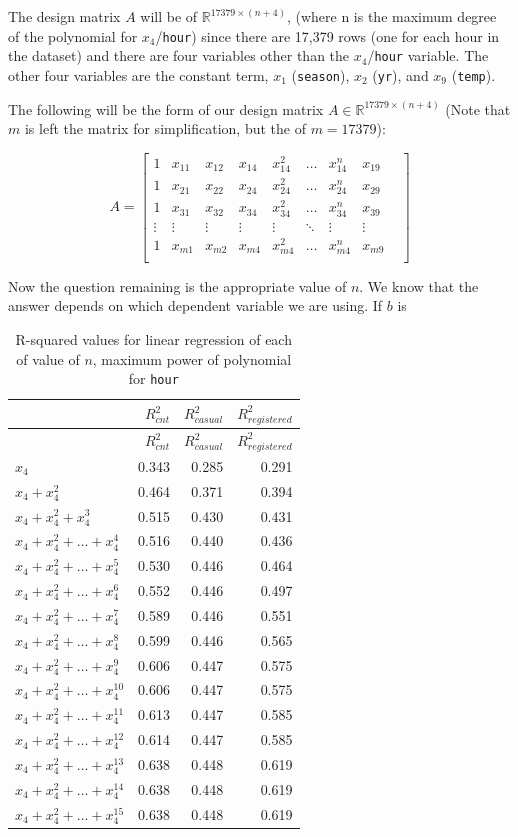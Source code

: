 \documentclass[
]{article}
\begin{document}
The design matrix \(A\) will be of \(\mathbb{R}^{17379 \times (n+4)}\),
(where n is the maximum degree of the polynomial for
\(x_{4}\)/\texttt{hour}) since there are 17,379 rows (one for each hour
in the dataset) and there are four variables other than the
\(x_{4}\)/\texttt{hour} variable. The other four variables are the
constant term, \(x_{1}\) (\texttt{season}), \(x_{2}\) (\texttt{yr}), and
\(x_{9}\) (\texttt{temp}).

The following will be the form of our design matrix
\(A \in \mathbb{R}^{17379 \times (n+4)}\) (Note that \(m\) is left the
matrix for simplification, but the of \(m = 17379\)):

\[
A=
  \begin{bmatrix}
    1 & x_{11} & x_{12} & x_{14} & x_{14}^{2} & \dots & x_{14}^{n} & x_{19} \\
    1 & x_{21} & x_{22} & x_{24} & x_{24}^{2} & \dots & x_{24}^{n} & x_{29} \\
    1 & x_{31} & x_{32} & x_{34} & x_{34}^{2} & \dots & x_{34}^{n} & x_{39} \\
    \vdots & \vdots & \vdots & \vdots & \vdots & \ddots & \vdots & \vdots & \\
    1 & x_{m1} & x_{m2} & x_{m4} & x_{m4}^{2} & \dots & x_{m4}^{n} & x_{m9} \\
  \end{bmatrix}
\]

Now the question remaining is the appropriate value of \(n\). We know
that the answer depends on which dependent variable we are using. If
\(b\) is

\begin{longtable}[]{@{}lrrr@{}}
\caption{R-squared values for linear regression of each of value of
\(n\), maximum power of polynomial for \texttt{hour}}\tabularnewline
\toprule
& \(R^{2}_{cnt}\) & \(R^{2}_{casual}\) &
\(R^{2}_{registered}\)\tabularnewline
\midrule
\endfirsthead
\toprule
& \(R^{2}_{cnt}\) & \(R^{2}_{casual}\) &
\(R^{2}_{registered}\)\tabularnewline
\midrule
\endhead
\(x_{4}\) & 0.343 & 0.285 & 0.291\tabularnewline
\(x_{4}+x_{4}^{2}\) & 0.464 & 0.371 & 0.394\tabularnewline
\(x_{4}+x_{4}^{2}+x_{4}^{3}\) & 0.515 & 0.430 & 0.431\tabularnewline
\(x_{4}+x_{4}^{2}+\dots+x_{4}^{4}\) & 0.516 & 0.440 &
0.436\tabularnewline
\(x_{4}+x_{4}^{2}+\dots+x_{4}^{5}\) & 0.530 & 0.446 &
0.464\tabularnewline
\(x_{4}+x_{4}^{2}+\dots+x_{4}^{6}\) & 0.552 & 0.446 &
0.497\tabularnewline
\(x_{4}+x_{4}^{2}+\dots+x_{4}^{7}\) & 0.589 & 0.446 &
0.551\tabularnewline
\(x_{4}+x_{4}^{2}+\dots+x_{4}^{8}\) & 0.599 & 0.446 &
0.565\tabularnewline
\(x_{4}+x_{4}^{2}+\dots+x_{4}^{9}\) & 0.606 & 0.447 &
0.575\tabularnewline
\(x_{4}+x_{4}^{2}+\dots+x_{4}^{10}\) & 0.606 & 0.447 &
0.575\tabularnewline
\(x_{4}+x_{4}^{2}+\dots+x_{4}^{11}\) & 0.613 & 0.447 &
0.585\tabularnewline
\(x_{4}+x_{4}^{2}+\dots+x_{4}^{12}\) & 0.614 & 0.447 &
0.585\tabularnewline
\(x_{4}+x_{4}^{2}+\dots+x_{4}^{13}\) & 0.638 & 0.448 &
0.619\tabularnewline
\(x_{4}+x_{4}^{2}+\dots+x_{4}^{14}\) & 0.638 & 0.448 &
0.619\tabularnewline
\(x_{4}+x_{4}^{2}+\dots+x_{4}^{15}\) & 0.638 & 0.448 &
0.619\tabularnewline
\bottomrule
\end{longtable}
\end{document}
